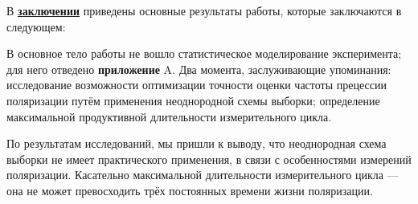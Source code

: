 В \underline{\textbf{заключении}} приведены основные результаты работы, которые заключаются в следующем:


В основное тело работы не вошло статистическое моделирование эксперимента; для него отведено \textbf{приложение} A. Два момента, заслуживающие упоминания: исследование возможности оптимизации точности оценки частоты прецессии поляризации путём применения неоднородной схемы выборки; определение максимальной продуктивной длительности измерительного цикла. 

По результатам исследований, мы пришли к выводу, что неоднородная схема выборки не имеет практического применения, в связи с особенностями измерений поляризации. Касательно максимальной длительности измерительного цикла --- она не может превосходить трёх постоянных времени жизни поляризации.

